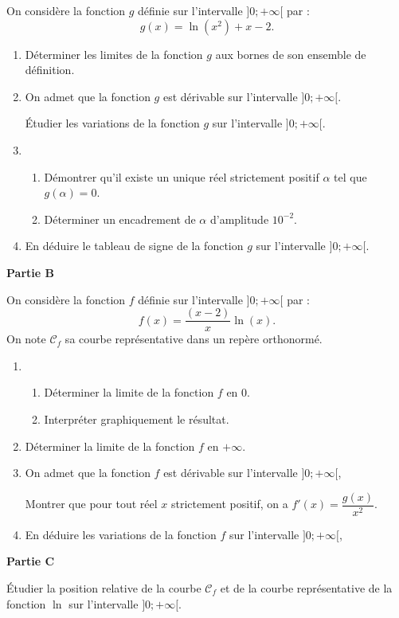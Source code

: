 On considère la fonction $g$ définie sur l'intervalle $]0;+\infty[$ par : \[g(x) = \ln \left(x^2\right) + x - 2.\]

\begin{enumerate}
	\item Déterminer les limites de la fonction $g$ aux bornes de son ensemble de définition.
	\item On admet que la fonction $g$ est dérivable sur l'intervalle $]0;+\infty[$.
	
	Étudier les variations de la fonction $g$ sur l'intervalle $]0;+\infty[$.
	\item 
	\begin{enumerate}
		\item Démontrer qu'il existe un unique réel strictement positif $\alpha$ tel que $g(\alpha) = 0$.
		\item Déterminer un encadrement de $\alpha$ d'amplitude $10^{-2}$.
	\end{enumerate}
	\item En déduire le tableau de signe de la fonction $g$ sur l'intervalle $]0;+\infty[$.
\end{enumerate}

\smallskip

\textbf{Partie B}

\medskip

On considère la fonction $f$ définie sur l'intervalle $]0;+\infty[$ par : \[f(x) = \dfrac{(x-2)}{x}\ln(x).\]
%
On note $\mathcal{C}_f$ sa courbe représentative dans un repère orthonormé.

\begin{enumerate}
	\item
	\begin{enumerate}
		\item Déterminer la limite de la fonction $f$ en 0.
		\item Interpréter graphiquement le résultat.
	\end{enumerate}
	\item  Déterminer la limite de la fonction $f$ en $+\infty$.
	\item On admet que la fonction $f$ est dérivable sur l'intervalle $]0;+\infty[$,
	
	Montrer que pour tout réel $x$ strictement positif, on a $f'(x)=\dfrac{g(x)}{x^2}$.
	
	\item En déduire les variations de la fonction $f$ sur l'intervalle $]0;+\infty[$,
\end{enumerate}

\smallskip

\textbf{Partie C}

\medskip

Étudier la position relative de la courbe $\mathcal{C}_f$ et de la courbe représentative de la fonction $\ln$ sur l'intervalle $]0;+\infty[$.
